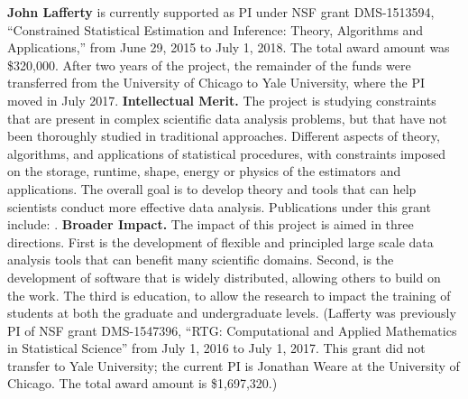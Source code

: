 \vskip10pt \textbf{John Lafferty} is currently supported as PI under NSF
grant DMS-1513594, ``Constrained Statistical Estimation and Inference:
Theory, Algorithms and Applications,'' from June 29, 2015 to July 1,
2018. The total award amount was \$320,000. After two years of the
project, the remainder of the funds were transferred from the
University of Chicago to Yale University, where the PI moved in July
2017.
{\bf Intellectual Merit.}  The project is studying constraints that
are present in complex scientific data analysis problems, but that
have not been thoroughly studied in traditional approaches. Different
aspects of theory, algorithms, and applications of statistical
procedures, with constraints imposed on the storage, runtime, shape,
energy or physics of the estimators and applications. The overall goal
is to develop theory and tools that can help
scientists conduct more effective data analysis. Publications under
this grant include: \citep{ChatterjeeL18,MishraILH18,
abs-1803-01302,MishraLH17,YangB0L16,ChatterjeeDLZ16,ZhengL16,
MishraZLH15,ZhengL15,ZhuL14,Bonak18}.
{\bf Broader Impact.} The impact of this project is aimed in
three directions. First is the development of flexible and principled
large scale data analysis tools that can benefit many scientific
domains. Second, is the development of software that is widely
distributed, allowing others to build on the work. The third is
education, to allow the research to impact the training of students at
both the graduate and undergraduate levels. (Lafferty was previously PI of NSF grant
DMS-1547396, ``RTG: Computational and Applied Mathematics in
Statistical Science'' from July 1, 2016 to July 1, 2017. This grant
did not transfer to Yale University; the current PI is Jonathan Weare
at the University of Chicago. The total award amount is \$1,697,320.)

%

